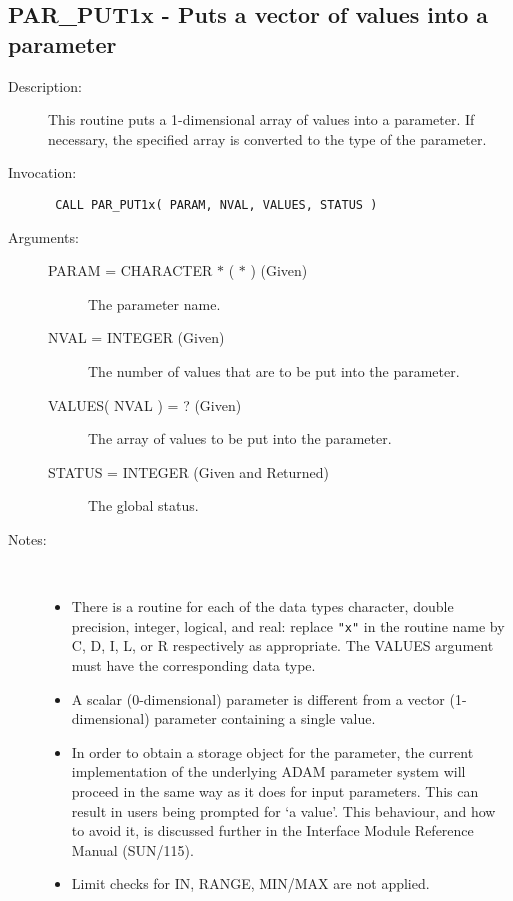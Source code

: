 \documentclass[twoside,11pt]{article}
\newcommand{\xref}[3]{#1}
\newcommand{\xlabel}[1]{}
\newlength{\sstbannerlength}
\newlength{\sstcaptionlength}
\newlength{\sstexampleslength}
\newlength{\sstexampleswidth}
\newcommand{\sstroutine}[3]{
   \goodbreak
   \rule{\textwidth}{0.5mm}
   \vspace{-7ex}
   \newline
   \settowidth{\sstbannerlength}{{\Large {\bf #1}}}
   \setlength{\sstcaptionlength}{\textwidth}
   \setlength{\sstexampleslength}{\textwidth}
   \addtolength{\sstbannerlength}{0.5em}
   \addtolength{\sstcaptionlength}{-2.0\sstbannerlength}
   \addtolength{\sstcaptionlength}{-5.0pt}
   \settowidth{\sstexampleswidth}{{\bf Examples:}}
   \addtolength{\sstexampleslength}{-\sstexampleswidth}
   \parbox[t]{\sstbannerlength}{\flushleft{\Large {\bf #1}}}
   \parbox[t]{\sstcaptionlength}{\center{\Large #2}}
   \parbox[t]{\sstbannerlength}{\flushright{\Large {\bf #1}}}
   \begin{description}
      #3
   \end{description}
}
\newcommand{\sstdescription}[1]{\item[Description:] #1}
\newcommand{\sstinvocation}[1]{\item[Invocation:]\hspace{0.4em}{\tt #1}}
\newcommand{\sstarguments}[1]{
   \item[Arguments:] \mbox{} \\
   \vspace{-3.5ex}
   \begin{description}
      #1
   \end{description}
}
\newcommand{\sstsubsection}[1]{ \item[{#1}] \mbox{} \\}
\newcommand{\sstnotes}[1]{\item[Notes:] \mbox{} \\[1.3ex] #1}
\newcommand{\sstitemlist}[1]{
  \mbox{} \\
  \vspace{-7ex}
  \begin{itemize}
     #1
  \end{itemize}
}
\newcommand{\sstitem}{\item}
\newcommand{\ssttt}{\tt}
\renewcommand{\sstroutine}[3]{
      \subsection{\xlabel{12}#1\xlabel{#1}-\label{#1}#2}
      \begin{description}
         #3
      \end{description}
   }
\renewcommand{\sstdescription}[1]{\item[Description:]
      \begin{description}
         #1
      \end{description}
   }
\renewcommand{\sstinvocation}[1]{\item[Invocation:]
      \begin{description}
         {\ssttt #1}
      \end{description}
   }
\renewcommand{\sstarguments}[1]{
      \item[Arguments:]
      \begin{description}
         #1
      \end{description}
   }
\renewcommand{\sstsubsection}[1]{\item[{#1}]}
\renewcommand{\sstnotes}[1]{\item[Notes:]
      \begin{description}
         #1
      \end{description}
   }
\newcommand{\sstitemlist}[1]{
      \begin{itemize}
         #1
      \end{itemize}
   }
\begin{document}
\sstroutine{
   PAR\_PUT1x
}{
   Puts a vector of values into a parameter
}{
   \sstdescription{
      This routine puts a 1-dimensional array of values into a
      parameter.  If necessary, the specified array is converted to
      the type of the parameter.
   }
   \sstinvocation{
      CALL PAR\_PUT1x( PARAM, NVAL, VALUES, STATUS )
   }
   \sstarguments{
      \sstsubsection{
         PARAM = CHARACTER $*$ ( $*$ ) (Given)
      }{
         The parameter name.
      }
      \sstsubsection{
         NVAL = INTEGER (Given)
      }{
         The number of values that are to be put into the parameter.
      }
      \sstsubsection{
         VALUES( NVAL ) = ? (Given)
      }{
         The array of values to be put into the parameter.
      }
      \sstsubsection{
         STATUS = INTEGER (Given and Returned)
      }{
         The global status.
      }
   }
   \sstnotes{
      \sstitemlist{

         \sstitem
         There is a routine for each of the data types character,
         double precision, integer, logical, and real: replace {\tt "x"} in the
         routine name by C, D, I, L, or R respectively as appropriate.  The
         VALUES argument must have the corresponding data type.

         \sstitem
         A scalar (0-dimensional) parameter is different from a vector
         (1-dimensional) parameter containing a single value.

         \sstitem
         In order to obtain a storage object for the parameter, the
         current implementation of the underlying ADAM parameter system
         will proceed in the same way as it does for input parameters.
         This can result in users being prompted for `a value'. This
         behaviour, and how to avoid it, is discussed further in the
         Interface Module Reference Manual 
         (\xref{SUN/115}{sun115}{parameter_specification_for_output_parameters}).

         \sstitem
         Limit checks for IN, RANGE, MIN/MAX are not applied.
      }
   }
}
\end{document}

